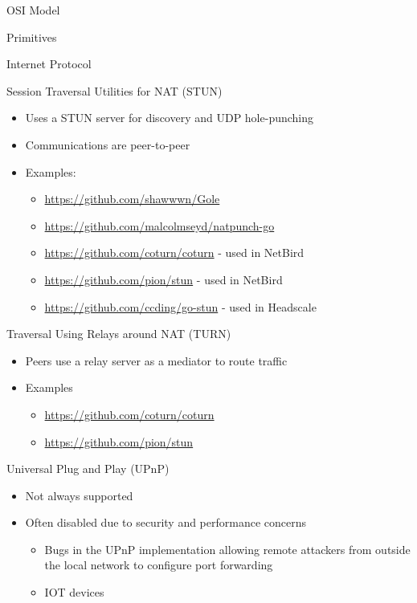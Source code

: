 \begin{frame}[fragile]{OSI Model}
\begin{block}{Primitives}
\begin{block}{Internet Protocol}
\begin{block}{Session Traversal Utilities for NAT (STUN)}
\protect\hypertarget{session-traversal-utilities-for-nat-stun}{}
\begin{itemize}
\item
  Uses a STUN server for discovery and UDP hole-punching
\item
  Communications are peer-to-peer
\item
  Examples:

  \begin{itemize}
  \item
    \url{https://github.com/shawwwn/Gole}
  \item
    \url{https://github.com/malcolmseyd/natpunch-go}
  \item
    \url{https://github.com/coturn/coturn} - used in NetBird
  \item
    \url{https://github.com/pion/stun} - used in NetBird
  \item
    \url{https://github.com/ccding/go-stun} - used in Headscale
  \end{itemize}
\end{itemize}
\end{block}

\begin{block}{Traversal Using Relays around NAT (TURN)}
\protect\hypertarget{traversal-using-relays-around-nat-turn}{}
\begin{itemize}
\item
  Peers use a relay server as a mediator to route traffic
\item
  Examples

  \begin{itemize}
  \item
    \url{https://github.com/coturn/coturn}
  \item
    \url{https://github.com/pion/stun}
  \end{itemize}
\end{itemize}
\end{block}

\begin{block}{Universal Plug and Play (UPnP)}
\protect\hypertarget{universal-plug-and-play-upnp}{}
\begin{itemize}
\tightlist
\item
  Not always supported
\item
  Often disabled due to security and performance concerns

  \begin{itemize}
  \tightlist
  \item
    Bugs in the UPnP implementation allowing remote attackers from
    outside the local network to configure port forwarding
  \item
    IOT devices


\end{itemize}
\end{itemize}
\end{block}
\end{block}
\end{block}
\end{frame}
